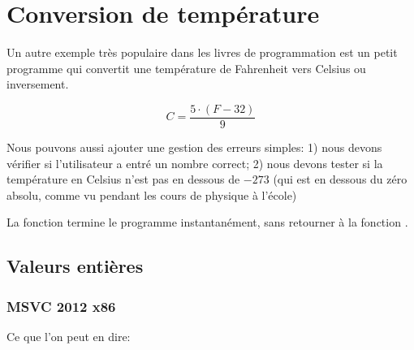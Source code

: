 ﻿\section{Conversion de température}

Un autre exemple très populaire dans
les livres de programmation est un petit programme qui convertit une température de Fahrenheit vers Celsius ou inversement.

\[
	C=\frac{5 \cdot (F-32)}{9}
\]

Nous pouvons aussi ajouter une gestion des erreurs simples:
1) nous devons vérifier si l'utilisateur a entré un nombre correct;
2) nous devons tester si la température en Celsius n'est pas en dessous de $-273$ 
(qui est en dessous du zéro absolu, comme vu pendant les cours de physique à l'école)

La fonction  termine 
le programme instantanément, sans retourner à la fonction .

\subsection{Valeurs entières}



\subsubsection{MSVC 2012 x86 \Optimizing}



Ce que l'on peut en dire:

